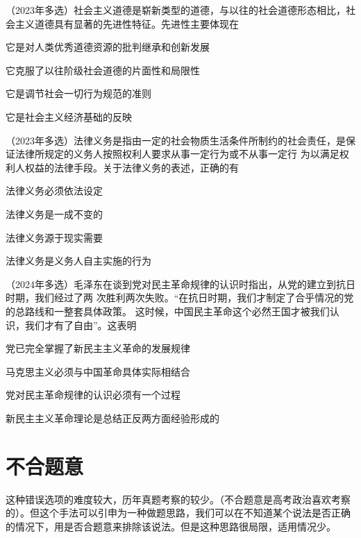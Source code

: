 \documentclass[lang=cn,newtx,10pt,scheme=chinese,pad,twocol]{zznote}
\begin{document}
\begin{example} （2023年多选）社会主义道德是崭新类型的道德，与以往的社会道德形态相比，社
	会主义道德具有显著的先进性特征。先进性主要体现在
	\begin{choice}
		\item 它是对人类优秀道德资源的批判继承和创新发展
		\item 它克服了以往阶级社会道德的片面性和局限性
		\item 它是调节社会一切行为规范的准则
		\item 它是社会主义经济基础的反映
	\end{choice}
\end{example}

\begin{example} （2023年多选）法律义务是指由一定的社会物质生活条件所制约的社会责任，是保 证法律所规定的义务人按照权利人要求从事一定行为或不从事一定行
	为以满足权利人权益的法律手段。关于法律义务的表述，正确的有

	\begin{choice}
		\item 法律义务必须依法设定
		\item 法律义务是一成不变的
		\item 法律义务源于现实需要
		\item 法律义务是义务人自主实施的行为
	\end{choice}
\end{example}

\begin{example} （2024年多选）毛泽东在谈到党对民主革命规律的认识时指出，从党的建立到抗日时期，我们经过了两 次胜利两次失败。“在抗日时期，我们才制定了合乎情况的党的总路线和一整套具体政策。 这时候，中国民主革命这个必然王国才被我们认识，我们才有了自由”。这表明
	\begin{choice}
		\item 党已完全掌握了新民主主义革命的发展规律
		\item 马克思主义必须与中国革命具体实际相结合
		\item 党对民主革命规律的认识必须有一个过程
		\item 新民主主义革命理论是总结正反两方面经验形成的
	\end{choice}
\end{example}


\section{不合题意}
\begin{definition}
	这种错误选项的难度较大，历年真题考察的较少。（不合题意是高考政治喜欢考察的）。但这个手法可以引申为一种做题思路，我们可以在不知道某个说法是否正确的情况下，用是否合题意来排除该说法。但是这种思路很局限，适用情况少。
\end{definition}
\end{document}
